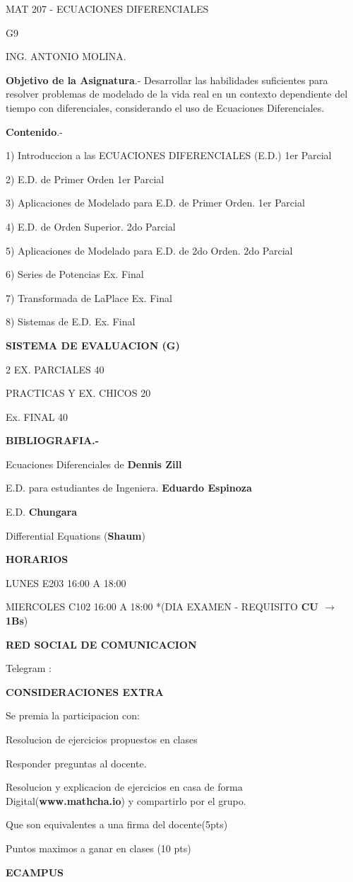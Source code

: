 \documentclass{article}
\begin{document}
MAT 207 - ECUACIONES DIFERENCIALES

G9

ING. ANTONIO MOLINA.



\textbf{Objetivo de la Asignatura}.-  Desarrollar las habilidades suficientes para resolver problemas de modelado de la vida real en un contexto dependiente del tiempo con diferenciales, considerando el uso de Ecuaciones Diferenciales.



\textbf{Contenido}.-

1) Introduccion a las ECUACIONES DIFERENCIALES (E.D.)	1er Parcial

2) E.D.  de Primer Orden								1er Parcial

3) Aplicaciones de Modelado para E.D. de Primer Orden.		1er Parcial

4) E.D. de Orden Superior.								2do Parcial

5) Aplicaciones de Modelado para E.D. de 2do Orden.			2do Parcial

6) Series de Potencias									Ex. Final

7) Transformada de LaPlace								Ex. Final

8) Sistemas de E.D.									Ex. Final



\textbf{SISTEMA DE EVALUACION (G)}

2 EX. PARCIALES 				40%

PRACTICAS Y EX. CHICOS 		20%

Ex. FINAL					40%



\textbf{BIBLIOGRAFIA.-}

Ecuaciones Diferenciales de \textbf{Dennis Zill}

E.D. para estudiantes de Ingeniera.\textbf{ Eduardo Espinoza}

E.D. \textbf{Chungara}

Differential Equations (\textbf{Shaum})



\textbf{HORARIOS}

LUNES 		E203 	16:00 A 18:00

MIERCOLES   C102 	16:00 A 18:00    *(DIA EXAMEN -  REQUISITO \textbf{CU $\rightarrow$  1Bs})



\textbf{RED SOCIAL DE COMUNICACION}

Telegram : 



\textbf{CONSIDERACIONES EXTRA}

Se premia la participacion con:

	Resolucion de ejercicios propuestos en clases

	Responder preguntas al docente.

	Resolucion y explicacion de ejercicios en casa de forma Digital(\textbf{www.mathcha.io}) y compartirlo por el grupo.

Que son equivalentes a una firma del docente(5pts)

Puntos maximos a  ganar en clases (10 pts)



\textbf{ECAMPUS}
\end{document}
